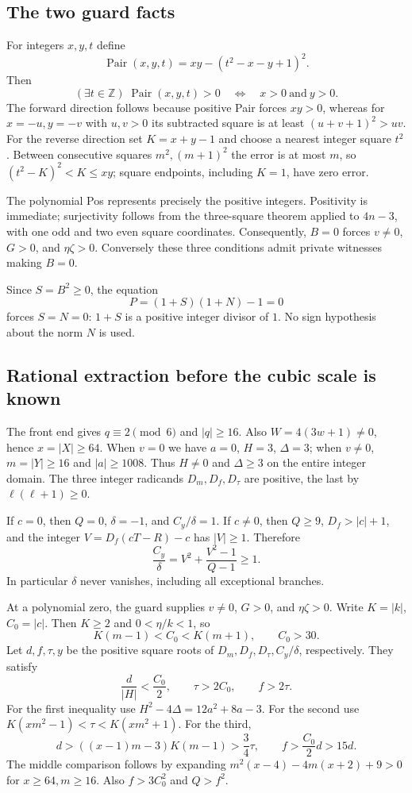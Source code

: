 \subsection{The two guard facts}

For integers $x,y,t$ define
\[
 \operatorname{Pair}(x,y,t)=xy-(t^2-x-y+1)^2.
\]
Then
\[
 (\exists t\in\mathbb Z)\;\operatorname{Pair}(x,y,t)>0
 \quad\Longleftrightarrow\quad x>0\ \text{and}\ y>0.
\]
The forward direction follows because positive Pair forces $xy>0$, whereas
for $x=-u,y=-v$ with $u,v>0$ its subtracted square is at least
$(u+v+1)^2>uv$. For the reverse direction set $K=x+y-1$ and choose a
nearest integer square $t^2$. Between consecutive squares $m^2,(m+1)^2$
the error is at most $m$, so $(t^2-K)^2<K\le xy$; square endpoints,
including $K=1$, have zero error.

The polynomial Pos represents precisely the positive integers. Positivity
is immediate; surjectivity follows from the three-square theorem applied
to $4n-3$, with one odd and two even square coordinates. Consequently,
$B=0$ forces $v\ne0$, $G>0$, and $\eta\zeta>0$. Conversely these three
conditions admit private witnesses making $B=0$.

Since $S=B^2\ge0$, the equation
\[
 P=(1+S)(1+N)-1=0
\]
forces $S=N=0$: $1+S$ is a positive integer divisor of $1$. No sign
hypothesis about the norm $N$ is used.

\subsection{Rational extraction before the cubic scale is known}

The front end gives $q\equiv2\pmod6$ and $|q|\ge16$. Also
$W=4(3w+1)\ne0$, hence $x=|X|\ge64$. When $v=0$ we have $a=0$,
$H=3$, $\Delta=3$; when $v\ne0$, $m=|Y|\ge16$ and $|a|\ge1008$.
Thus $H\ne0$ and $\Delta\ge3$ on the entire integer domain.
The three integer radicands $D_m,D_f,D_\tau$ are positive, the last by
$\ell(\ell+1)\ge0$.

If $c=0$, then $Q=0$, $\delta=-1$, and $C_y/\delta=1$. If $c\ne0$,
then $Q\ge9$, $D_f>|c|+1$, and the integer $V=D_f(cT-R)-c$ has
$|V|\ge1$. Therefore
\[
 \frac{C_y}{\delta}=V^2+\frac{V^2-1}{Q-1}\ge1.
\]
In particular $\delta$ never vanishes, including all exceptional branches.

At a polynomial zero, the guard supplies $v\ne0$, $G>0$, and
$\eta\zeta>0$. Write $K=|k|$, $C_0=|c|$. Then $K\ge2$ and
$0<\eta/k<1$, so
\[
 K(m-1)<C_0<K(m+1),\qquad C_0>30.
\]
Let $d,f,\tau,y$ be the positive square roots of
$D_m,D_f,D_\tau,C_y/\delta$, respectively. They satisfy
\[
 \frac{d}{|H|}<\frac{C_0}{2},\qquad
 \tau>2C_0,\qquad f>2\tau.
\]
For the first inequality use $H^2-4\Delta=12a^2+8a-3$.
For the second use
$K(xm^2-1)<\tau<K(xm^2+1)$.
For the third,
\[
 d>((x-1)m-3)K(m-1)>\frac34\tau,
 \qquad f>\frac{C_0}{2}d>15d.
\]
The middle comparison follows by expanding
$m^2(x-4)-4m(x+2)+9>0$ for $x\ge64,m\ge16$.
Also $f>3C_0^2$ and $Q>f^2$.

